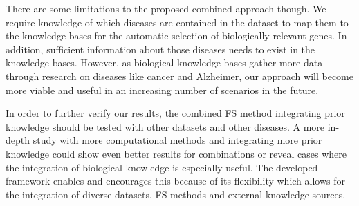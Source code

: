 There are some limitations to the proposed combined approach though. 
We require knowledge of which diseases are contained in the dataset to map them to the knowledge bases for the automatic selection of biologically relevant genes.
In addition, sufficient information about those diseases needs to exist in the knowledge bases.
However, as biological knowledge bases gather more data through research on diseases like cancer and Alzheimer, our approach will become more viable and useful in an increasing number of scenarios in the future.

In order to further verify our results, the combined FS method integrating prior knowledge should be tested with other datasets and other diseases. 
A more in-depth study with more computational methods and integrating more prior knowledge could show even better results for combinations or reveal cases where the integration of biological knowledge is especially useful. 
The developed framework enables and encourages this because of its flexibility which allows for the integration of diverse datasets, FS methods and external knowledge sources.
